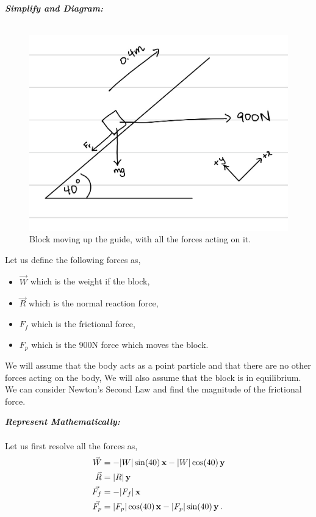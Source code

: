 \begin{subquestions}
\begin{subsubquestions}

\subsubquestion

\textbf{\textit{Simplify and Diagram:}} \\ \\
\begin{figure}[H]
	\begin{center}
		\includegraphics[scale=0.25]{../2011/figures/2011q6-1}
		\caption{\label{2011:q6:Diagram3} Block moving up the guide, with all the forces acting on it.}
	\end{center}
\end{figure}

Let us define the following forces as,
\begin{itemize}
	\item $\vec{W}$ which is the weight if the block,
	\item $\vec{R}$ which is the normal reaction force,
	\item $F_f$ which is the frictional force,
	\item $F_{p}$ which is the 900N force which moves the block.
\end{itemize}
We will assume that the body acts as a point particle and that there are no other forces acting on the body, We will also assume that the block is in equilibrium. We can consider Newton's Second Law and find the magnitude of the frictional force.




\textbf{\textit{Represent Mathematically:}} \\ \\
Let us first resolve all the forces as,
\begin{align}
	\vec{W} & = -|W|\sin(40)\,\mathbf{x} - |W|\cos(40)\,\mathbf{y}  \\ 
	\vec{R} & = |R|\,\mathbf{y}  \\ 
	\vec{F_f} & = -|F_f|\,\mathbf{x}  \\
	\vec{F_p} & = |F_p|\cos(40) \,\mathbf{x} -|F_p|\sin(40) \,\mathbf{y} \,.
\end{align}


\end{subsubquestions}
\end{subquestions}
